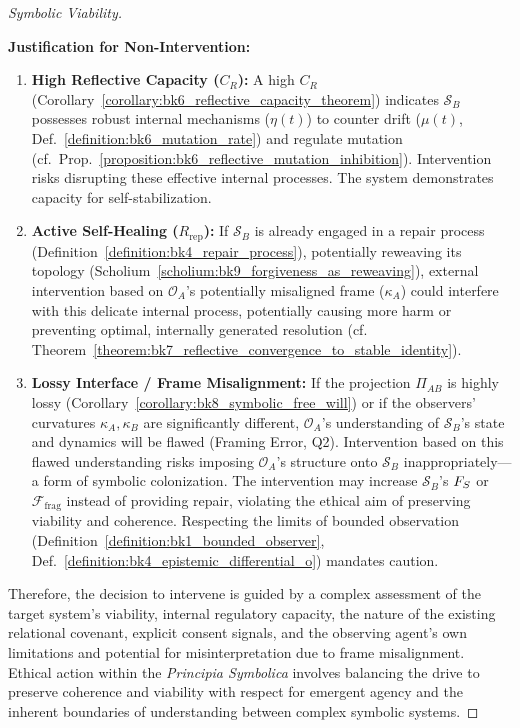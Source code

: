 \begin{proof}[Symbolic Viability]
\begin{enumerate}
\end{enumerate}
\textbf{Justification for Non-Intervention:}
\begin{enumerate}
    \item \textbf{High Reflective Capacity ($C_R$):} A high $C_R$ (Corollary~\ref{corollary:bk6_reflective_capacity_theorem}) indicates $\mathcal{S}_B$ possesses robust internal mechanisms ($\eta(t)$) to counter drift ($\mu(t)$, Def.~\ref{definition:bk6_mutation_rate}) and regulate mutation (cf.~Prop.~\ref{proposition:bk6_reflective_mutation_inhibition}). Intervention risks disrupting these effective internal processes. The system demonstrates capacity for self-stabilization.
    \item \textbf{Active Self-Healing ($R_{\text{rep}}$):} If $\mathcal{S}_B$ is already engaged in a repair process (Definition~\ref{definition:bk4_repair_process}), potentially reweaving its topology (Scholium~\ref{scholium:bk9_forgiveness_as_reweaving}), external intervention based on $\mathcal{O}_A$'s potentially misaligned frame ($\kappa_A$) could interfere with this delicate internal process, potentially causing more harm or preventing optimal, internally generated resolution (cf. Theorem~\ref{theorem:bk7_reflective_convergence_to_stable_identity}).
    \item \textbf{Lossy Interface / Frame Misalignment:} If the projection $\Pi_{AB}$ is highly lossy (Corollary~\ref{corollary:bk8_symbolic_free_will}) or if the observers' curvatures $\kappa_A, \kappa_B$ are significantly different, $\mathcal{O}_A$'s understanding of $\mathcal{S}_B$'s state and dynamics will be flawed (Framing Error, Q2). Intervention based on this flawed understanding risks imposing $\mathcal{O}_A$'s structure onto $\mathcal{S}_B$ inappropriately—a form of symbolic colonization. The intervention may increase $\mathcal{S}_B$'s $F_S$ or $\mathcal{F}_{\text{frag}}$ instead of providing repair, violating the ethical aim of preserving viability and coherence. Respecting the limits of bounded observation (Definition~\ref{definition:bk1_bounded_observer}, Def.~\ref{definition:bk4_epistemic_differential_o}) mandates caution.
\end{enumerate}
Therefore, the decision to intervene is guided by a complex assessment of the target system's viability, internal regulatory capacity, the nature of the existing relational covenant, explicit consent signals, and the observing agent's own limitations and potential for misinterpretation due to frame misalignment. Ethical action within the \textit{Principia Symbolica} involves balancing the drive to preserve coherence and viability with respect for emergent agency and the inherent boundaries of understanding between complex symbolic systems.
\end{proof}
